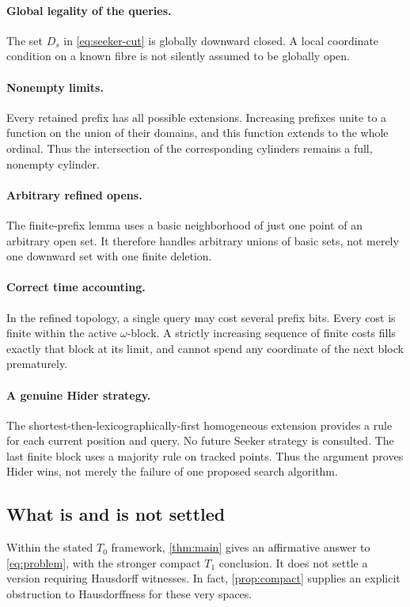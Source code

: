 \documentclass[11pt,a4paper]{article}
\theoremstyle{definition}
\theoremstyle{remark}
\begin{document}
\paragraph{Global legality of the queries.}
The set $D_s$ in \eqref{eq:seeker-cut} is globally downward closed. A local
coordinate condition on a known fibre is not silently assumed to be globally
open.

\paragraph{Nonempty limits.}
Every retained prefix has all possible extensions. Increasing prefixes unite
to a function on the union of their domains, and this function extends to the
whole ordinal. Thus the intersection of the corresponding cylinders remains a
full, nonempty cylinder.

\paragraph{Arbitrary refined opens.}
The finite-prefix lemma uses a basic neighborhood of just one point of an
arbitrary open set. It therefore handles arbitrary unions of basic sets, not
merely one downward set with one finite deletion.

\paragraph{Correct time accounting.}
In the refined topology, a single query may cost several prefix bits. Every
cost is finite within the active $\omega$-block. A strictly increasing sequence
of finite costs fills exactly that block at its limit, and cannot spend any
coordinate of the next block prematurely.

\paragraph{A genuine Hider strategy.}
The shortest-then-lexicographically-first homogeneous extension provides a
rule for each current position and query. No future Seeker strategy is consulted.
The last finite block uses a majority rule on tracked points. Thus the argument
proves Hider wins, not merely the failure of one proposed search algorithm.

\subsection{What is and is not settled}
Within the stated $T_0$ framework, \cref{thm:main} gives an affirmative answer
to \eqref{eq:problem}, with the stronger compact $T_1$ conclusion. It does not
settle a version requiring Hausdorff witnesses. In fact,
\cref{prop:compact} supplies an explicit obstruction to Hausdorffness for these
very spaces.
\end{document}
